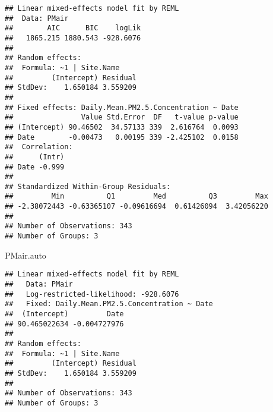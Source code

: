 \documentclass[]{article}
\newenvironment{Shaded}{\begin{snugshade}}{\end{snugshade}}
\newcommand{\KeywordTok}[1]{\textcolor[rgb]{0.13,0.29,0.53}{\textbf{#1}}}
\newcommand{\DataTypeTok}[1]{\textcolor[rgb]{0.13,0.29,0.53}{#1}}
\newcommand{\DecValTok}[1]{\textcolor[rgb]{0.00,0.00,0.81}{#1}}
\newcommand{\FloatTok}[1]{\textcolor[rgb]{0.00,0.00,0.81}{#1}}
\newcommand{\StringTok}[1]{\textcolor[rgb]{0.31,0.60,0.02}{#1}}
\newcommand{\CommentTok}[1]{\textcolor[rgb]{0.56,0.35,0.01}{\textit{#1}}}
\newcommand{\OperatorTok}[1]{\textcolor[rgb]{0.81,0.36,0.00}{\textbf{#1}}}
\newcommand{\NormalTok}[1]{#1}
\begin{document}
\begin{Shaded}
\end{Shaded}

\begin{verbatim}
## Linear mixed-effects model fit by REML
##  Data: PMair 
##        AIC      BIC    logLik
##   1865.215 1880.543 -928.6076
## 
## Random effects:
##  Formula: ~1 | Site.Name
##         (Intercept) Residual
## StdDev:    1.650184 3.559209
## 
## Fixed effects: Daily.Mean.PM2.5.Concentration ~ Date 
##                Value Std.Error  DF   t-value p-value
## (Intercept) 90.46502  34.57133 339  2.616764  0.0093
## Date        -0.00473   0.00195 339 -2.425102  0.0158
##  Correlation: 
##      (Intr)
## Date -0.999
## 
## Standardized Within-Group Residuals:
##         Min          Q1         Med          Q3         Max 
## -2.38072443 -0.63365107 -0.09616694  0.61426094  3.42056220 
## 
## Number of Observations: 343
## Number of Groups: 3
\end{verbatim}

\begin{Shaded}
\begin{Highlighting}[]
\NormalTok{PMair.auto}
\end{Highlighting}
\end{Shaded}

\begin{verbatim}
## Linear mixed-effects model fit by REML
##   Data: PMair 
##   Log-restricted-likelihood: -928.6076
##   Fixed: Daily.Mean.PM2.5.Concentration ~ Date 
##  (Intercept)         Date 
## 90.465022634 -0.004727976 
## 
## Random effects:
##  Formula: ~1 | Site.Name
##         (Intercept) Residual
## StdDev:    1.650184 3.559209
## 
## Number of Observations: 343
## Number of Groups: 3
\end{verbatim}
\end{document}
